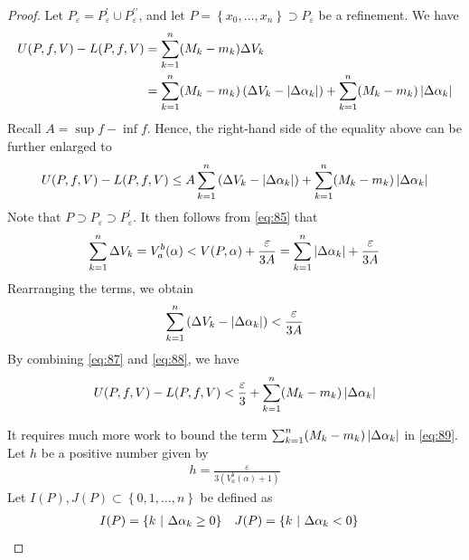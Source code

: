 \documentclass[thmcnt=section, 12pt]{my-elegantbook}
\begin{document}
\begin{proof}
    \par Let $P_\varepsilon = P^\prime_\varepsilon \cup P^{\prime\prime}_\varepsilon$, and let $P = \left\{x_0, \ldots, x_n\right\} \supset P_\varepsilon$ be a refinement. We have 
    \begin{align*}
        U(P,f,V) - L(P,f,V)
        &= \sum_{k=1}^n (M_k - m_k) \Delta V_k \\ 
        &= \sum_{k=1}^n (M_k - m_k) \left( \Delta V_k - \left\lvert \Delta\alpha_k \right\rvert \right)
        + \sum_{k=1}^n (M_k - m_k) \left\lvert \Delta\alpha_k \right\rvert
    \end{align*}
    Recall $A = \sup f - \inf f$. Hence, the right-hand side of the equality above can be further enlarged to
    \begin{align}
        U(P,f,V) - L(P,f,V)
        \leq A \sum_{k=1}^n \left( \Delta V_k - \left\lvert \Delta\alpha_k \right\rvert \right)
        + \sum_{k=1}^n (M_k - m_k) \left\lvert \Delta\alpha_k \right\rvert
        \label{eq:87}
    \end{align}
    Note that $P \supset P_\varepsilon \supset P^\prime_\varepsilon$. It then follows from \eqref{eq:85} that 
    \begin{align*}
        \sum_{k=1}^n \Delta V_k
        = V_a^b(\alpha) 
        < V(P, \alpha)
        + \frac{\varepsilon}{3A}
        = \sum_{k=1}^n \left\lvert \Delta\alpha_k \right\rvert
        + \frac{\varepsilon}{3A}
    \end{align*}
    Rearranging the terms, we obtain 
    \begin{align}
        \sum_{k=1}^n \left( \Delta V_k - \left\lvert \Delta\alpha_k \right\rvert \right)
        < \frac{\varepsilon}{3A}
        \label{eq:88}
    \end{align}
    By combining \eqref{eq:87} and \eqref{eq:88}, we have 
    \begin{align}
        U(P,f,V) - L(P,f,V)
        < \frac{\varepsilon}{3}
        + \sum_{k=1}^n (M_k - m_k) \left\lvert \Delta\alpha_k \right\rvert
        \label{eq:89}
    \end{align}

    It requires much more work to bound the term $\sum_{k=1}^n (M_k - m_k) \left\lvert \Delta\alpha_k \right\rvert$ in \eqref{eq:89}. Let $h$ be a positive number given by 
    \begin{align*}
        h = \frac{\varepsilon}{3(V_a^b (\alpha) + 1)}
    \end{align*}
    Let $I(P), J(P) \subset \left\{0, 1, \ldots, n\right\}$ be defined as 
    \begin{align*}
        I(P) &= \left\{ k \ \middle| \ \Delta\alpha_k \geq 0 \right\} & 
        J(P) &= \left\{ k \ \middle| \ \Delta\alpha_k < 0 \right\}
    \end{align*}


\end{proof}
\end{document}
